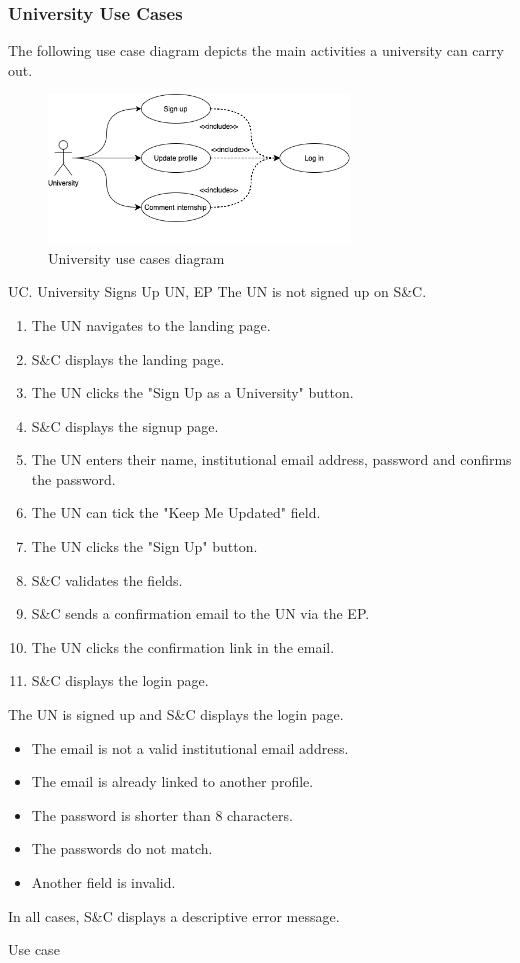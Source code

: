 
\clearpage
\subsubsection{University Use Cases}
The following use case diagram depicts the main activities a university can carry out.

\begin{figure}[h]
    \centering
    \includegraphics[width=8cm]{images/use-case-diagrams/university.png}
    \caption{University use cases diagram}
\end{figure}

\begin{usecase}
    {UC\theuc. University Signs Up}
    {UN, EP}
    {The UN is not signed up on S\&C.}
    {\begin{enumerate}[leftmargin=*]
        \item The UN navigates to the landing page.
        \item S\&C displays the landing page.
        \item The UN clicks the "Sign Up as a University" button.
        \item S\&C displays the signup page.
        \item The UN enters their name, institutional email address, password and confirms the password.
        \item The UN can tick the "Keep Me Updated" field.
        \item The UN clicks the "Sign Up" button.
        \item S\&C validates the fields.
        \item S\&C sends a confirmation email to the UN via the EP.
        \item The UN clicks the confirmation link in the email.
        \item S\&C displays the login page.
    \end{enumerate}}
    {The UN is signed up and S\&C displays the login page.}
    {\begin{itemize}[leftmargin=*, label=\tiny\textbullet]
        \item The email is not a valid institutional email address.
        \item The email is already linked to another profile.
        \item The password is shorter than 8 characters.
        \item The passwords do not match.
        \item Another field is invalid.
    \end{itemize}
    In all cases, S\&C displays a descriptive error message.}
    {Use case \theuc}
\end{usecase}

